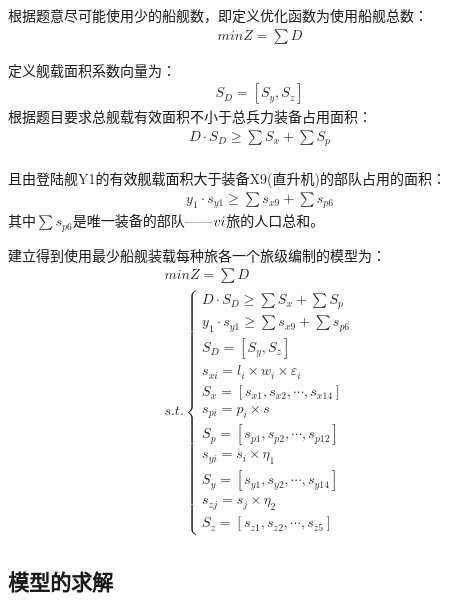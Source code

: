 \documentclass{whutmod}
\begin{document}
	    根据题意尽可能使用少的船舰数，即定义优化函数为使用船舰总数：
	     \begin{gather}
	     min Z=\sum D
	  \end{gather}
	    
	    
	   定义舰载面积系数向量为：
	    \begin{gather}
	    S_{D}=[S_{y}, S_{z}]
    	\end{gather}
    	根据题目要求总舰载有效面积不小于总兵力装备占用面积：
    	 \begin{gather}
    	 D\cdot S_{D}\geq \sum  S_{x} + \sum  S_{p}
    	 \end{gather}
    	 ~\\
    	 
    	 且由登陆舰Y1的有效舰载面积大于装备X9(直升机)的部队占用的面积：
    	  \begin{gather}
    	 y_{1}\cdot s_{y1}\geq \sum s_{x9}+ \sum  s_{p6}
    	 \end{gather}
    	 其中$\sum  s_{p6}$是唯一装备的部队——$\uppercase\expandafter{\romannumeral6}$旅的人口总和。
    	 

    	 建立得到使用最少船舰装载每种旅各一个旅级编制的模型为：
    	  \begin{gather}
    	 min Z=\sum D\\ 
    	  s.t.\left\{\begin{matrix}	 D\cdot S_{D}\geq \sum  S_{x} + \sum  S_{p}
    	 \\ y_{1}\cdot s_{y1}\geq \sum s_{x9}+ \sum  s_{p6}
    	 \\S_{D}=[S_{y}, S_{z}]
    	 \\ s_{xi}=l_{i}\times w_{i} \times \varepsilon _{i}
    	 \\S_{x}=[s_{x1},s_{x2},\cdots,s_{x14}]
    	 \\s_{pi}=p_{i}\times s
    	 \\S_{p}=[s_{p1},s_{p2},\cdots,s_{p12}]
    	 \\     s_{yi}=s_{i}\times \eta_{1}
    	 \\   S_{y}=[s_{y1},s_{y2},\cdots,s_{y14}]
    	 \\      s_{zj}=s_{j}\times \eta_{2}
    	 \\ S_{z}=[s_{z1},s_{z2},\cdots,s_{z5}]
    	 \end{matrix}\right. 
     	 \end{gather}
    		    	
	\subsection{模型的求解}
  
\end{document}
